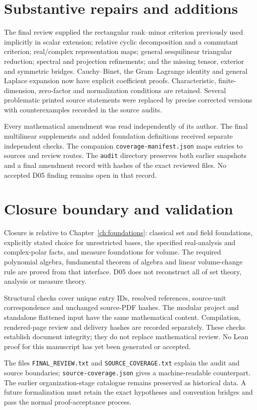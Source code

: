 \documentclass[11pt,a4paper]{book}
\theoremstyle{definition}\newtheorem{definition}[theorem]{Definition}
\theoremstyle{remark}\newtheorem{remark}[theorem]{Remark}
\begin{document}
\section*{Substantive repairs and additions}
The final review supplied the rectangular rank--minor criterion previously used implicitly in scalar extension; relative cyclic decomposition and a commutant criterion; real/complex representation maps; general sesquilinear triangular reduction; spectral and projection refinements; and the missing tensor, exterior and symmetric bridges. Cauchy--Binet, the Gram--Lagrange identity and general Laplace expansion now have explicit coefficient proofs. Characteristic, finite-dimension, zero-factor and normalization conditions are retained. Several problematic printed source statements were replaced by precise corrected versions with counterexamples recorded in the source audits.

Every mathematical amendment was read independently of its author. The final multilinear supplements and added foundation definitions received separate independent checks. The companion \texttt{coverage-manifest.json} maps entries to sources and review routes. The \texttt{audit} directory preserves both earlier snapshots and a final amendment record with hashes of the exact reviewed files. No accepted D05 finding remains open in that record.

\section*{Closure boundary and validation}
Closure is relative to Chapter~\ref{ch:foundations}: classical set and field foundations, explicitly stated choice for unrestricted bases, the specified real-analysis and complex-polar facts, and measure foundations for volume. The required polynomial algebra, fundamental theorem of algebra and linear volume-change rule are proved from that interface. D05 does not reconstruct all of set theory, analysis or measure theory.

Structural checks cover unique entry IDs, resolved references, source-unit correspondence and unchanged source-PDF hashes. The modular project and standalone flattened input have the same mathematical content. Compilation, rendered-page review and delivery hashes are recorded separately. These checks establish document integrity; they do not replace mathematical review. No Lean proof for this manuscript has yet been generated or accepted.

The files \texttt{FINAL\_REVIEW.txt} and \texttt{SOURCE\_COVERAGE.txt} explain the audit and source boundaries; \texttt{source-coverage.json} gives a machine-readable counterpart. The earlier organization-stage catalogue remains preserved as historical data. A future formalization must retain the exact hypotheses and convention bridges and pass the normal proof-acceptance process.

\end{document}
